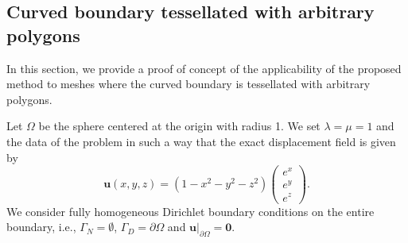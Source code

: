 \documentclass[a4paper,11pt]{article}
\theoremstyle{remark}
\theoremstyle{definition}
\newcommand{\uu}{\mathbf{u}}
\begin{document}
\subsection{Curved boundary tessellated with arbitrary polygons}\label{sec:convGenCur}

In this section, we provide a proof of concept of the applicability of the proposed method 
to meshes where the curved boundary is tessellated with arbitrary polygons.

Let $\Omega$ be the sphere centered at the origin with radius 1.
We set $\lambda = \mu = 1$ and the data of the problem in such a way that 
the exact displacement field is given by 
\[
\uu(x, y, z) = 
(1 - x^2-y^2-z^2)
\begin{pmatrix}
e^x \\
e^y \\
e^z
\end{pmatrix}.
\]
We consider fully homogeneous Dirichlet boundary conditions on the entire boundary, i.e.,
$\Gamma_N=\emptyset$, $\Gamma_D=\partial \Omega$ and $\uu|_{\partial \Omega} = \mathbf{0}$.
\end{document}
